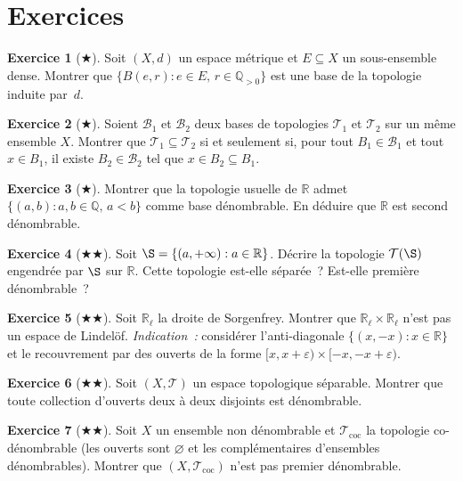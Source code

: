 \documentclass[12pt,a4paper,openany]{book}
\theoremstyle{definition}
\theoremstyle{cours}
\theoremstyle{coursnormal}
\newtheorem{exercice}{Exercice}[chapter]
\newcommand{\Q}{\mathbb{Q}}
\newcommand{\R}{\mathbb{R}}
\newcommand{\T}{\mathcal{T}}
\newcommand{\B}{\mathcal{B}}
\begin{document}
\section{Exercices}\label{sec:exercices-ch3}

\begin{exercice}[$\bigstar$]
  Soit $(X,d)$ un espace métrique et $E\subseteq X$ un sous-ensemble dense.
  Montrer que $\{B(e,r) : e\in E,\, r\in\Q_{>0}\}$ est une base de la
  topologie induite par~$d$.
\end{exercice}

\begin{exercice}[$\bigstar$]
  Soient $\B_1$ et $\B_2$ deux bases de topologies $\T_1$ et $\T_2$ sur un
  même ensemble $X$. Montrer que $\T_1\subseteq\T_2$ si et seulement si, pour
  tout $B_1\in\B_1$ et tout $x\in B_1$, il existe $B_2\in\B_2$ tel que
  $x\in B_2\subseteq B_1$.
\end{exercice}

\begin{exercice}[$\bigstar$]
  Montrer que la topologie usuelle de $\R$ admet
  $\{(a,b) : a,b\in\Q,\, a<b\}$ comme base dénombrable. En déduire que $\R$
  est second dénombrable.
\end{exercice}

\begin{exercice}[$\bigstar\bigstar$]
  Soit $\S = \{(a,+\infty) : a\in\R\}$. Décrire la topologie $\T(\S)$
  engendrée par $\S$ sur $\R$. Cette topologie est-elle séparée~? Est-elle
  première dénombrable~?
\end{exercice}

\begin{exercice}[$\bigstar\bigstar$]\label{exo:sorgenfrey-produit}
  Soit $\R_\ell$ la droite de Sorgenfrey. Montrer que $\R_\ell\times\R_\ell$
  n'est pas un espace de Lindelöf.
  \emph{Indication~:} considérer l'anti-diagonale
  $\{(x,-x) : x\in\R\}$ et le recouvrement par des ouverts de la forme
  $[x,x+\varepsilon)\times[-x,-x+\varepsilon)$.
\end{exercice}

\begin{exercice}[$\bigstar\bigstar$]
  Soit $(X,\T)$ un espace topologique séparable. Montrer que toute collection
  d'ouverts deux à deux disjoints est dénombrable.
\end{exercice}

\begin{exercice}[$\bigstar\bigstar$]
  Soit $X$ un ensemble non dénombrable et $\T_{\mathrm{coc}}$ la topologie
  co-dénombrable (les ouverts sont $\varnothing$ et les complémentaires
  d'ensembles dénombrables). Montrer que $(X,\T_{\mathrm{coc}})$ n'est pas
  premier dénombrable.
\end{exercice}
\end{document}
